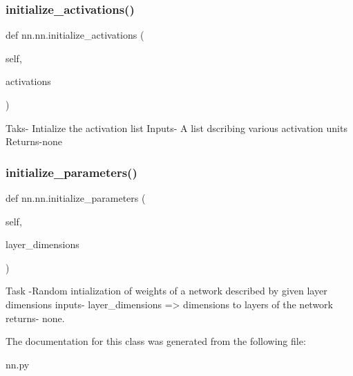 \subsubsection{\texorpdfstring{initialize\+\_\+activations()}{initialize\_activations()}}
{\footnotesize\ttfamily def nn.\+nn.\+initialize\+\_\+activations (\begin{DoxyParamCaption}\item[{}]{self,  }\item[{}]{activations }\end{DoxyParamCaption})}

\begin{DoxyVerb}Taks- Intialize the activation list 
Inputs- A list dscribing various activation units
Returns-none
\end{DoxyVerb}
 \mbox{\label{classnn_1_1nn_a9821fed1369b4d709fe297fe9e07d97b}} 
\subsubsection{\texorpdfstring{initialize\+\_\+parameters()}{initialize\_parameters()}}
{\footnotesize\ttfamily def nn.\+nn.\+initialize\+\_\+parameters (\begin{DoxyParamCaption}\item[{}]{self,  }\item[{}]{layer\+\_\+dimensions }\end{DoxyParamCaption})}

\begin{DoxyVerb}Task -Random intialization of weights of a network described by given layer dimensions
inputs- layer_dimensions => dimensions to layers of the network
returns- none.
\end{DoxyVerb}
 

The documentation for this class was generated from the following file\+:\begin{DoxyCompactItemize}
\item 
nn.\+py\end{DoxyCompactItemize}
